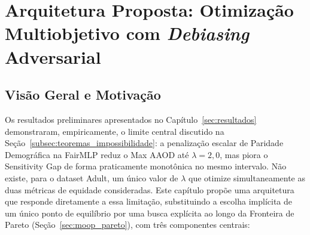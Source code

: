 \chapter{Arquitetura Proposta: Otimização Multiobjetivo com \textit{Debiasing} Adversarial}\label{chap:proposta}

\section{Visão Geral e Motivação}

Os resultados preliminares apresentados no Capítulo~\ref{sec:resultados} demonstraram, empiricamente, o limite central discutido na Seção~\ref{subsec:teoremas_impossibilidade}: a penalização escalar de Paridade Demográfica na FairMLP reduz o Max AAOD até $\lambda = 2,0$, mas piora o Sensitivity Gap de forma praticamente monotônica no mesmo intervalo. Não existe, para o dataset Adult, um único valor de $\lambda$ que otimize simultaneamente as duas métricas de equidade consideradas. Este capítulo propõe uma arquitetura que responde diretamente a essa limitação, substituindo a escolha implícita de um único ponto de equilíbrio por uma busca explícita ao longo da Fronteira de Pareto (Seção~\ref{sec:moop_pareto}), com três componentes centrais:

